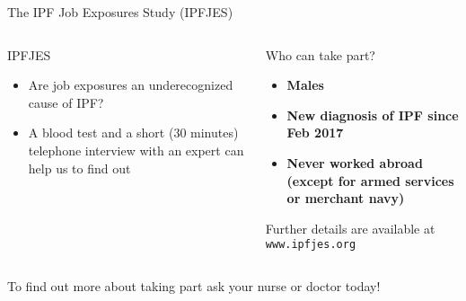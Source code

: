 \documentclass{beamer}
\begin{document}
\begin{frame}[fragile]{The IPF Job Exposures Study (IPFJES)}
\begin{columns}[t]
\begin{column}{0.5\textwidth}
IPFJES
\begin{itemize}
\item Are job exposures an underecognized cause of IPF? 
\item A blood test and a short (30 minutes) telephone interview with an expert can help us to find out 
\end{itemize}
\end{column}
\begin{column}{0.5\textwidth}
Who can take part?
\begin{itemize}
\item \bfseries{Males}
\item \bfseries{New diagnosis of IPF since Feb 2017}
\item \bfseries{Never worked abroad (except for armed services or merchant navy)}
\end{itemize}
Further details are available at  \verb|www.ipfjes.org|
\end{column}
\end{columns}
\begin{center}
To find out more about taking part ask your nurse or doctor today!
\end{center}
\end{frame}
\end{document}

